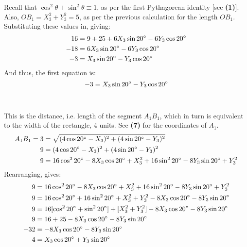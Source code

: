 \documentclass{article}
\begin{document}
            Recall that $\cos^2{\theta} + \sin^2{\theta} \equiv 1$, as per the first Pythagorean identity [see \textbf{(1)}]. Also, $OB_1 = X_3^2 + Y_3^2 = 5$, as per the previous calculation for the length $OB_1$. Substituting these values in, giving:
            \begin{align*}
                16 &= 9 + 25 + 6X_3\sin{20\degree} - 6Y_3\cos{20\degree} \\
                -18 &= 6X_3\sin{20\degree} - 6Y_3\cos{20\degree} \\
                -3 &= X_3\sin{20\degree} - Y_3\cos{20\degree}
            \end{align*}
            And thus, the first equation is:
            \begin{equation}
                -3 = X_3\sin{20\degree} - Y_3\cos{20\degree}
            \end{equation} \\\\
            This is the distance, i.e. length of the segment $A_1B_1$, which in turn is equivalent to the width of the rectangle, 4 units. See \textbf{(7)} for the coordinates of $A_1$.
            \begin{align*}
                A_1B_1 = 3 &= \sqrt{(4\cos{20\degree} - X_3)^2 + (4\sin{20\degree} - Y_3)^2} \\
                9 &= (4\cos{20\degree} - X_3)^2 + (4\sin{20\degree} - Y_3)^2 \\
                9 &= 16\cos^2{20\degree} - 8X_3\cos{20\degree} + X_3^2 + 16\sin^2{20\degree} - 8Y_3\sin{20\degree} + Y_3^2
            \end{align*}
            Rearranging, gives:
            \begin{align*}
                9 &= 16\cos^2{20\degree} - 8X_3\cos{20\degree} + X_3^2 + 16\sin^2{20\degree} - 8Y_3\sin{20\degree} + Y_3^2 \\
                9 &= 16\cos^2{20\degree} + 16\sin^2{20\degree} + X_3^2 + Y_3^2 - 8X_3\cos{20\degree} - 8Y_3\sin{20\degree} \\
                9 &= 16[\cos^2{20\degree} + \sin^2{20\degree}] + [X_3^2 + Y_3^2] - 8X_3\cos{20\degree} - 8Y_3\sin{20\degree} \\
                9 &= 16 + 25 - 8X_3\cos{20\degree} - 8Y_3\sin{20\degree} \\
                -32 &= - 8X_3\cos{20\degree} - 8Y_3\sin{20\degree} \\
                4 &= X_3\cos{20\degree} + Y_3\sin{20\degree}
            \end{align*}
\end{document}
